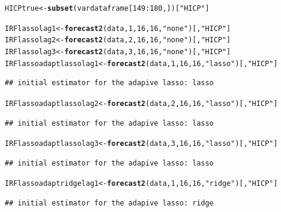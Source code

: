 \documentclass[11pt,oneside, a4paper]{amsart}\usepackage[]{graphicx}\usepackage[]{color}
\makeatletter
\newcommand{\hlnum}[1]{\textcolor[rgb]{0.686,0.059,0.569}{#1}}%
\newcommand{\hlstr}[1]{\textcolor[rgb]{0.192,0.494,0.8}{#1}}%
\newcommand{\hlopt}[1]{\textcolor[rgb]{0,0,0}{#1}}%
\newcommand{\hlstd}[1]{\textcolor[rgb]{0.345,0.345,0.345}{#1}}%
\newcommand{\hlkwb}[1]{\textcolor[rgb]{0.69,0.353,0.396}{#1}}%
\newcommand{\hlkwd}[1]{\textcolor[rgb]{0.737,0.353,0.396}{\textbf{#1}}}%
\newenvironment{kframe}{%
 \def\at@end@of@kframe{}%
 \ifinner\ifhmode%
  \def\at@end@of@kframe{\end{minipage}}%
  \begin{minipage}{\columnwidth}%
 \fi\fi%
 \def\FrameCommand##1{\hskip\@totalleftmargin \hskip-\fboxsep
 \colorbox{shadecolor}{##1}\hskip-\fboxsep
     \hskip-\linewidth \hskip-\@totalleftmargin \hskip\columnwidth}%
 \MakeFramed {\advance\hsize-\width
   \@totalleftmargin\z@ \linewidth\hsize
   \@setminipage}}%
 {\par\unskip\endMakeFramed%
 \at@end@of@kframe}
\newenvironment{knitrout}{}{} %
\makeatother
\begin{document}
\begin{knitrout}
\color{fgcolor}\begin{kframe}
\begin{alltt}
\hlstd{HICPtrue}\hlkwb{<-}\hlkwd{subset}\hlstd{(vardataframe[}\hlnum{149}\hlopt{:}\hlnum{180}\hlstd{,])[}\hlstr{"HICP"}\hlstd{]}

\hlstd{IRFlassolag1}\hlkwb{<-}\hlkwd{forecast2}\hlstd{(data,}\hlnum{1}\hlstd{,}\hlnum{16}\hlstd{,}\hlnum{16}\hlstd{,}\hlstr{"none"}\hlstd{)[,}\hlstr{"HICP"}\hlstd{]}
\hlstd{IRFlassolag2}\hlkwb{<-}\hlkwd{forecast2}\hlstd{(data,}\hlnum{2}\hlstd{,}\hlnum{16}\hlstd{,}\hlnum{16}\hlstd{,}\hlstr{"none"}\hlstd{)[,}\hlstr{"HICP"}\hlstd{]}
\hlstd{IRFlassolag3}\hlkwb{<-}\hlkwd{forecast2}\hlstd{(data,}\hlnum{3}\hlstd{,}\hlnum{16}\hlstd{,}\hlnum{16}\hlstd{,}\hlstr{"none"}\hlstd{)[,}\hlstr{"HICP"}\hlstd{]}
\hlstd{IRFlassoadaptlassolag1}\hlkwb{<-}\hlkwd{forecast2}\hlstd{(data,}\hlnum{1}\hlstd{,}\hlnum{16}\hlstd{,}\hlnum{16}\hlstd{,}\hlstr{"lasso"}\hlstd{)[,}\hlstr{"HICP"}\hlstd{]}
\end{alltt}
\begin{verbatim}
## initial estimator for the adapive lasso: lasso
\end{verbatim}
\begin{alltt}
\hlstd{IRFlassoadaptlassolag2}\hlkwb{<-}\hlkwd{forecast2}\hlstd{(data,}\hlnum{2}\hlstd{,}\hlnum{16}\hlstd{,}\hlnum{16}\hlstd{,}\hlstr{"lasso"}\hlstd{)[,}\hlstr{"HICP"}\hlstd{]}
\end{alltt}
\begin{verbatim}
## initial estimator for the adapive lasso: lasso
\end{verbatim}
\begin{alltt}
\hlstd{IRFlassoadaptlassolag3}\hlkwb{<-}\hlkwd{forecast2}\hlstd{(data,}\hlnum{3}\hlstd{,}\hlnum{16}\hlstd{,}\hlnum{16}\hlstd{,}\hlstr{"lasso"}\hlstd{)[,}\hlstr{"HICP"}\hlstd{]}
\end{alltt}
\begin{verbatim}
## initial estimator for the adapive lasso: lasso
\end{verbatim}
\begin{alltt}
\hlstd{IRFlassoadaptridgelag1}\hlkwb{<-}\hlkwd{forecast2}\hlstd{(data,}\hlnum{1}\hlstd{,}\hlnum{16}\hlstd{,}\hlnum{16}\hlstd{,}\hlstr{"ridge"}\hlstd{)[,}\hlstr{"HICP"}\hlstd{]}
\end{alltt}
\begin{verbatim}
## initial estimator for the adapive lasso: ridge
\end{verbatim}

\end{kframe}
\end{knitrout}
\end{document}
